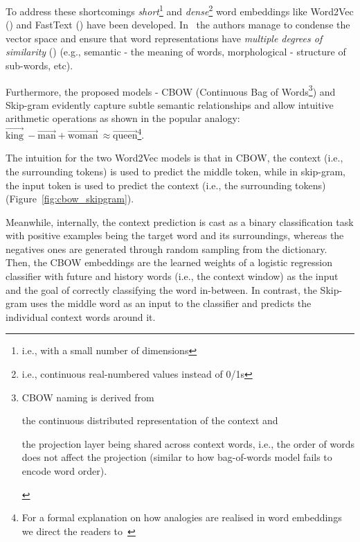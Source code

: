 To address these shortcomings \emph{short}\footnote{i.e., with a small number of dimensions} and \emph{dense}\footnote{i.e., continuous real-numbered values instead of 0/1s} word embeddings like Word2Vec (\cite{mikolov2013efficient}) and FastText (\cite{bojanowski-etal-2017-enriching}) have been developed.
In~\cite{mikolov2013efficient} the authors manage to condense the vector space and ensure that word representations have \emph{multiple degrees of similarity} (\cite{mikolov-etal-2013-linguistic}) (e.g., semantic - the meaning of words, morphological - structure of sub-words, etc).


Furthermore, the proposed models - CBOW (Continuous Bag of Words\footnote{
    CBOW naming is derived from \begin{enumerate*}
        \item the continuous distributed representation of the context and 
        \item the projection layer being shared across context words, i.e., the order of words does not affect the projection (similar to how bag-of-words model fails to encode word order).     
    \end{enumerate*} 
}) and Skip-gram evidently capture subtle semantic relationships and allow intuitive arithmetic operations as shown in the popular analogy: $\overrightarrow{\text{king}}\ - \overrightarrow{\text{man}} +\overrightarrow{\text{woman}}\ \approx \overrightarrow{\text{queen}}$\footnote{
    For a formal explanation on how analogies are realised in word embeddings we direct the readers to~\cite{ethayarajh-etal-2019-towards}
}.


The intuition for the two Word2Vec models is that in CBOW, the context (i.e., the surrounding tokens) is used to predict the middle token, while in skip-gram, the input token is used to predict the context (i.e., the surrounding tokens) (Figure~\ref{fig:cbow_skipgram}).

Meanwhile, internally, the context prediction is cast as a binary classification task with positive examples being the target word and its surroundings, whereas the negatives ones are generated through random sampling from the dictionary. 
Then, the CBOW embeddings are the learned weights of a logistic regression classifier with future and history words (i.e., the context window) as the input and the goal of correctly classifying the word in-between. 
In contrast, the Skip-gram uses the middle word as an input to the classifier and predicts the individual context words around it.

